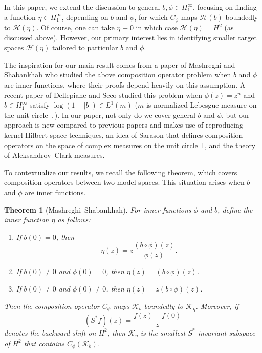 \documentclass[11pt]{amsart}
\def\T{\mathbb{T}}
\def\HH{{\mathcal H}}
\numberwithin{equation}{section}
\theoremstyle{plain}
\newtheorem{theorem}[equation]{Theorem}
\theoremstyle{definition}
\begin{document}
In this paper, we extend the discussion to general $b, \phi \in H^{\infty}_{1}$, focusing on finding a function $\eta\in H_1^\infty$, depending on  $b$ and $\phi$, for which $C_\phi$  maps $\mathcal{H}(b)$ boundedly to
$\mathcal{H}(\eta)$. Of course, one can take $\eta \equiv 0$ in which case $\HH(\eta) = H^2$ (as discussed above). However, our primary interest lies in identifying smaller target spaces $ \HH(\eta) $ tailored to particular $ b $ and $ \phi $.

The inspiration for our main result comes from a paper of Mashreghi and Shabankhah \cite{MR3176147} who studied the above  composition operator problem when $b$ and $\phi$ are inner functions, where their proofs depend heavily on this assumption. A recent paper of Dellepiane and Seco \cite{DELLEPIANE2027130974} studied this problem when $\phi(z)=z^n$ and $b \in H^\infty_1$ satisfy $\log(1-|b|)\in L^1(m)$ ($m$ is normalized Lebesgue measure on the unit circle $\T$). In our paper, not only do we cover general $b$ and $\phi$, but our approach is new compared to previous papers and makes use of reproducing kernel Hilbert space techniques, an idea of Sarason that defines composition operators on the space of complex measures on the unit circle $\T$, and the theory of Aleksandrov--Clark measures. 

To contextualize our results, we recall the following theorem, which covers composition operators between two model spaces. This situation arises when $b$ and $\phi$ are inner functions.  

\begin{theorem}[Mashreghi--Shabankhah]\label{Javad}
	For inner functions $\phi$ and $b$, define the inner function  $ \eta$ as follows:
	\begin{enumerate}
		\item If $ b(0)=0 $, then $$\eta(z)=	z\frac{(b\circ \phi)(z)}{\phi(z)}.$$
		
		\item If  $ b(0)\not=0$ and $ \phi(0)=0 $, then $ \eta(z)=	(b\circ\phi) (z) $.
		
		\item  If  $ b(0)\not=0$ and $ \phi(0)\not=0 $, then $ \eta(z)=	z(b\circ\phi) (z) $.
		
	\end{enumerate}
	Then   the composition operator $C_\phi$ maps $\mathcal{K}_b$ boundedly to $\mathcal{K}_{\eta}$.
	Moreover, if \begin{equation}\label{bkshift}
(S^{*} f)(z) = \frac{f(z) - f(0)}{z}
\end{equation}
denotes the backward shift on $H^2$, 
then    $\mathcal{K}_{\eta}$ is the smallest $S^*$-invariant subspace of $H^2$
	that contains $C_{\phi}(\mathcal{K}_{b})$. 
\end{theorem}
\end{document}
